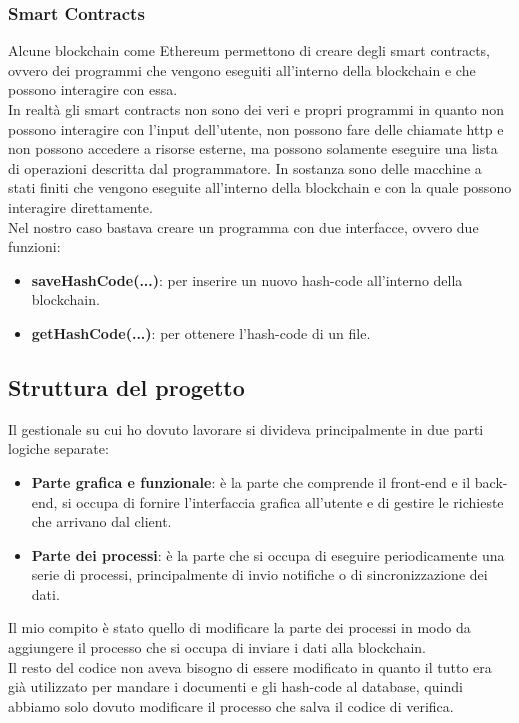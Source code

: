 \subsubsection{Smart Contracts}
Alcune blockchain come Ethereum permettono di creare degli smart contracts,
ovvero dei programmi che vengono eseguiti all'interno della blockchain e che
possono interagire con essa. \\
In realtà gli smart contracts non sono dei veri e propri programmi in quanto
non possono interagire con l'input dell'utente, non possono fare delle chiamate
http e non possono accedere a risorse esterne, ma possono solamente eseguire
una lista di operazioni descritta dal programmatore. In sostanza sono delle
macchine a stati finiti che vengono eseguite all'interno della blockchain e con
la quale possono interagire direttamente. \\
Nel nostro caso bastava creare un programma con due interfacce, ovvero due 
funzioni:
\begin{itemize}
    \item \textbf{saveHashCode(...)}: per inserire un nuovo hash-code
        all'interno della blockchain. 
    \item \textbf{getHashCode(...)}: per ottenere l'hash-code di un file.
\end{itemize}

\newpage

\subsection{Struttura del progetto}
Il gestionale su cui ho dovuto lavorare si divideva principalmente in due parti
logiche separate:
\begin{itemize}
    \item \textbf{Parte grafica e funzionale}: è la parte che comprende il
        front-end e il back-end, si occupa di fornire l'interfaccia grafica
        all'utente e di gestire le richieste che arrivano dal client.
    \item \textbf{Parte dei processi}: è la parte che si occupa di eseguire
        periodicamente una serie di processi, principalmente di invio notifiche 
        o di sincronizzazione dei dati.
\end{itemize}
Il mio compito è stato quello di modificare la parte dei processi in modo da
aggiungere il processo che si occupa di inviare i dati alla blockchain. \\
Il resto del codice non aveva bisogno di essere modificato in quanto il tutto
era già utilizzato per mandare i documenti e gli hash-code al database, quindi
abbiamo solo dovuto modificare il processo che salva il codice di verifica.

